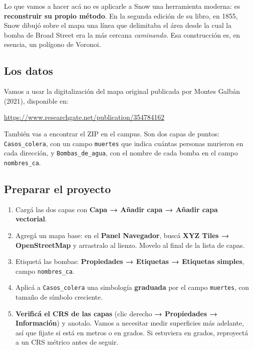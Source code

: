 \documentclass{article}
\begin{document}
Lo que vamos a hacer acá no es aplicarle a Snow una herramienta moderna: es \textbf{reconstruir su propio método}. En la segunda edición de su libro, en 1855, Snow dibujó sobre el mapa una línea que delimitaba el área desde la cual la bomba de Broad Street era la más cercana \emph{caminando}. Esa construcción es, en esencia, un polígono de Voronoi.

\subsection{Los datos}

Vamos a usar la digitalización del mapa original publicada por Montes Galbán (2021), disponible en:

\begin{center}
\url{https://www.researchgate.net/publication/354784162}
\end{center}

También vas a encontrar el ZIP en el campus. Son dos capas de puntos: \texttt{Casos\_colera}, con un campo \texttt{muertes} que indica cuántas personas murieron en cada dirección, y \texttt{Bombas\_de\_agua}, con el nombre de cada bomba en el campo \texttt{nombres\_ca}.

\subsection{Preparar el proyecto}

\begin{enumerate}
    \item Cargá las dos capas con \textbf{Capa → Añadir capa → Añadir capa vectorial}.
    \item Agregá un mapa base: en el \textbf{Panel Navegador}, buscá \textbf{XYZ Tiles → OpenStreetMap} y arrastralo al lienzo. Movelo al final de la lista de capas.
    \item Etiquetá las bombas: \textbf{Propiedades → Etiquetas → Etiquetas simples}, campo \texttt{nombres\_ca}.
    \item Aplicá a \texttt{Casos\_colera} una simbología \textbf{graduada} por el campo \texttt{muertes}, con tamaño de símbolo creciente.
    \item \textbf{Verificá el CRS de las capas} (clic derecho \textbf{→ Propiedades → Información}) y anotalo. Vamos a necesitar medir superficies más adelante, así que fijate si está en metros o en grados. Si estuviera en grados, reproyectá a un CRS métrico antes de seguir.
\end{enumerate}
\end{document}
